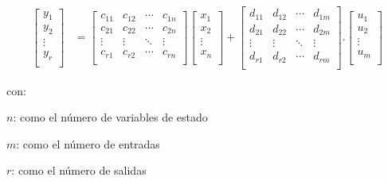 \begin{align}
\begin{bmatrix}
                    y_{1}\\
                    y_{2}\\
                    \vdots\\
                    y_{r}\\
                    \end{bmatrix}&=
                    \begin{bmatrix}
                    c_{11} & c_{12} & \cdots & c_{1n}\\
                    c_{21} & c_{22} & \cdots & c_{2n}\\
                    \vdots & \vdots & \ddots & \vdots\\
                    c_{r1} & c_{r2} & \cdots & c_{rn}\\
                    \end{bmatrix}
                    \begin{bmatrix}
                    x_{1}\\
                    x_{2}\\
                    \vdots\\
                    x_{n}\\
                    \end{bmatrix}+
                    \begin{bmatrix}
                    d_{11} & d_{12} & \cdots & d_{1m}\\
                    d_{21} & d_{22} & \cdots & d_{2m}\\
                    \vdots & \vdots & \ddots & \vdots\\
                    d_{r1} & d_{r2} & \cdots & d_{rm}\\
                    \end{bmatrix}.
                    \begin{bmatrix}
                    u_{1}\\
                    u_{2}\\
                    \vdots\\
                    u_{m}\\
                    \end{bmatrix}
            \end{align}
            \vspace{20pt}

            \begin{spacing}{1.5}
				\noindent con: 
				
				$n$: como el número de variables de estado
				
				$m$: como el número de entradas
				
				$r$: como el número de salidas
				
            \end{spacing}

